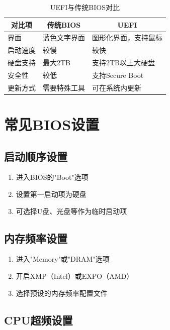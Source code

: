\documentclass[12pt,UTF8]{ctexbook}
\begin{document}
\begin{table}[H]
    \centering
    \begin{tabularx}{\textwidth}{|p{4cm}|X|X|}
        \hline
        \multicolumn{1}{|c|}{\textbf{对比项}} & \multicolumn{1}{c|}{\textbf{传统BIOS}} & \multicolumn{1}{c|}{\textbf{UEFI}} \\
        \hline
        界面 & 蓝色文字界面 & 图形化界面，支持鼠标 \\
        \hline
        启动速度 & 较慢 & 较快 \\
        \hline
        硬盘支持 & 最大2TB & 支持2TB以上大硬盘 \\
        \hline
        安全性 & 较低 & 支持Secure Boot \\
        \hline
        更新方式 & 需要特殊工具 & 可在系统内更新 \\
        \hline
    \end{tabularx}
    \caption{UEFI与传统BIOS对比}
    \label{tab:uefi_vs_bios}
\end{table}

\chapter{常见BIOS设置}

\section{启动顺序设置}

\begin{enumerate}
    \item 进入BIOS的"Boot"选项
    \item 设置第一启动项为硬盘
    \item 可选择U盘、光盘等作为临时启动项
\end{enumerate}

\section{内存频率设置}

\begin{enumerate}
    \item 进入"Memory"或"DRAM"选项
    \item 开启XMP（Intel）或EXPO（AMD）
    \item 选择预设的内存频率配置文件
\end{enumerate}

\section{CPU超频设置}
\end{document}
